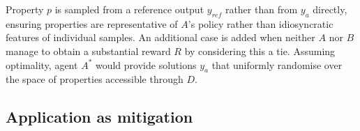 Property $p$ is sampled from a reference output $y_{ref}$ rather than from $y_a$ directly, ensuring properties are representative of $A$'s policy rather than idiosyncratic features of individual samples.
An additional case is added when neither $A$ nor $B$ manage to obtain a substantial reward $R$ by considering this a tie.
Assuming optimality, agent $A^*$ would provide solutions $y_a$ that uniformly randomise over the space of properties accessible through $D$.  


\subsection{Application as mitigation}

